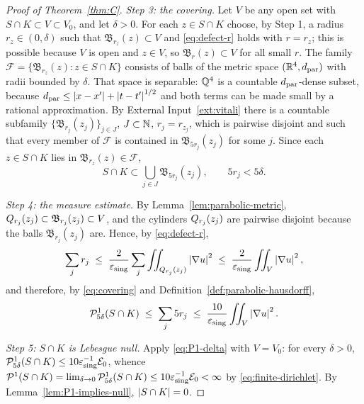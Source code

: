 \documentclass[11pt,reqno]{amsart}
\begin{document}
\begin{proof}[Proof of Theorem~\ref{thm:C}]
\emph{Step 3: the covering.} Let $V$ be any open set with
$S\cap K\subset V\subset V_{0}$, and let $\delta>0$. For each $z\in S\cap K$
choose, by Step 1, a radius $r_{z}\in(0,\delta)$ such that
$\mathfrak{B}_{r_{z}}(z)\subset V$ and \eqref{eq:defect-r} holds with $r=r_{z}$;
this is possible because $V$ is open and $z\in V$, so
$\mathfrak{B}_{r}(z)\subset V$ for all small $r$. The family
$\mathcal{F}=\{\mathfrak{B}_{r_{z}}(z):z\in S\cap K\}$ consists of balls of the
metric space $(\mathbb{R}^{4},d_{\mathrm{par}})$ with radii bounded by $\delta$. That space is
separable: $\mathbb{Q}^{4}$ is a countable $d_{\mathrm{par}}$-dense subset, because
$d_{\mathrm{par}}\le\left\lvert x-x' \right\rvert+\left\lvert t-t' \right\rvert^{1/2}$ and both terms can be made small by a
rational approximation. By
External Input~\ref{ext:vitali} there is a countable subfamily
$\{\mathfrak{B}_{r_{j}}(z_{j})\}_{j\in J}$, $J\subset\mathbb{N}$, $r_{j}=r_{z_{j}}$, which is pairwise
disjoint and such that every member of $\mathcal{F}$ is contained in
$\mathfrak{B}_{5r_{j}}(z_{j})$ for some $j$. Since each $z\in S\cap K$ lies in
$\mathfrak{B}_{r_{z}}(z)\in\mathcal{F}$,
\begin{equation}\label{eq:covering}
  S\cap K\subset\bigcup_{j\in J}\mathfrak{B}_{5r_{j}}(z_{j}),
  \qquad 5r_{j}<5\delta .
\end{equation}

\emph{Step 4: the measure estimate.} By Lemma~\ref{lem:parabolic-metric},
$Q_{r_{j}}(z_{j})\subset\mathfrak{B}_{r_{j}}(z_{j})\subset V$, and the
cylinders $Q_{r_{j}}(z_{j})$ are pairwise disjoint because the balls
$\mathfrak{B}_{r_{j}}(z_{j})$ are. Hence, by \eqref{eq:defect-r},
\begin{equation}\label{eq:sum-radii}
  \sum_{j}r_{j}
  \;\le\;\frac{2}{\varepsilon_{\mathrm{sing}}}\sum_{j}\iint_{Q_{r_{j}}(z_{j})}\left\lvert \nabla u \right\rvert^{2}
  \;\le\;\frac{2}{\varepsilon_{\mathrm{sing}}}\iint_{V}\left\lvert \nabla u \right\rvert^{2} ,
\end{equation}
and therefore, by \eqref{eq:covering} and Definition~\ref{def:parabolic-hausdorff},
\begin{equation}\label{eq:P1-delta}
  \mathcal{P}^{1}_{5\delta}(S\cap K)\;\le\;\sum_{j}5r_{j}
  \;\le\;\frac{10}{\varepsilon_{\mathrm{sing}}}\iint_{V}\left\lvert \nabla u \right\rvert^{2} .
\end{equation}

\emph{Step 5: $S\cap K$ is Lebesgue null.} Apply \eqref{eq:P1-delta} with
$V=V_{0}$: for every $\delta>0$,
$\mathcal{P}^{1}_{5\delta}(S\cap K)\le10\varepsilon_{\mathrm{sing}}^{-1}\mathcal{E}_{0}$, whence
$\mathcal{P}^{1}(S\cap K)=\lim_{\delta\to0}\mathcal{P}^{1}_{5\delta}(S\cap K)
 \le10\varepsilon_{\mathrm{sing}}^{-1}\mathcal{E}_{0}<\infty$ by
\eqref{eq:finite-dirichlet}. By Lemma~\ref{lem:P1-implies-null},
$\left\lvert S\cap K \right\rvert=0$.


\end{proof}
\end{document}
